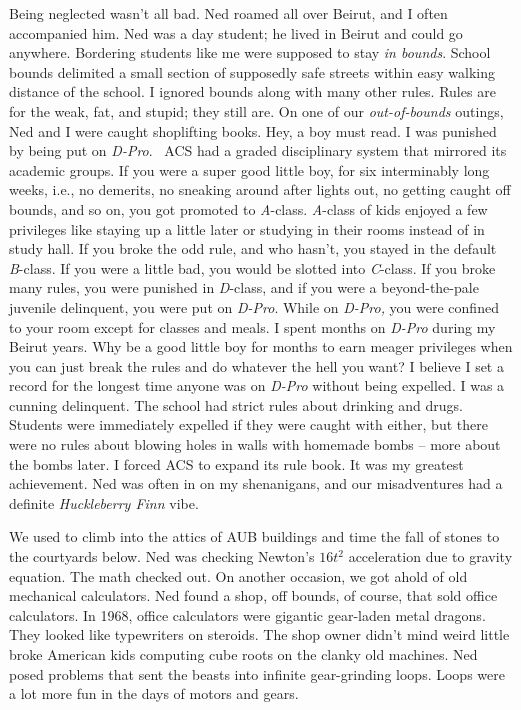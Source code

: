 Being neglected wasn't all bad. Ned roamed all over Beirut, and I often
accompanied him. Ned was a day student; he lived in Beirut and could go
anywhere. Bordering students like me were supposed to stay \emph{in
bounds}. School bounds delimited a small section of supposedly safe
streets within easy walking distance of the school. I ignored bounds
along with many other rules. Rules are for the weak, fat, and stupid;
they still are. On one of our \emph{out-of-bounds} outings, Ned and I
were caught shoplifting books. Hey, a boy must read. I was punished by
being put on \emph{D-Pro}.~ ACS had a graded disciplinary system that
mirrored its academic groups. If you were a super good little boy, for
six interminably long weeks, i.e., no demerits, no sneaking around after
lights out, no getting caught off bounds, and so on, you got promoted to
\emph{A}-class. \emph{A}-class of kids enjoyed a few privileges like
staying up a little later or studying in their rooms instead of in study
hall. If you broke the odd rule, and who hasn't, you stayed in the
default \emph{B}-class. If you were a little bad, you would be slotted
into \emph{C}-class. If you broke many rules, you were punished in
\emph{D}-class, and if you were a beyond-the-pale juvenile delinquent,
you were put on \emph{D-Pro}. While on \emph{D-Pro,} you were confined
to your room except for classes and meals. I spent months on
\emph{D-Pro} during my Beirut years. Why be a good little boy for months
to earn meager privileges when you can just break the rules and do
whatever the hell you want? I believe I set a record for the longest
time anyone was on \emph{D-Pro} without being expelled. I was a cunning
delinquent. The school had strict rules about drinking and drugs.
Students were immediately expelled if they were caught with either, but
there were no rules about blowing holes in walls with homemade bombs --
more about the bombs later. I forced ACS to expand its rule book. It was
my greatest achievement. Ned was often in on my shenanigans, and our
misadventures had a definite \emph{Huckleberry Finn} vibe.

We used to climb into the attics of AUB buildings and time the fall of
stones to the courtyards below. Ned was checking Newton's
$16t^2$ acceleration due to
gravity equation. The math checked out. On another occasion, we got
ahold of old mechanical calculators. Ned found a shop, off bounds, of
course, that sold office calculators. In 1968, office calculators were
gigantic gear-laden metal dragons. They looked like typewriters on
steroids. The shop owner didn't mind weird little broke American kids
computing cube roots on the clanky old machines. Ned posed problems that
sent the beasts into infinite gear-grinding loops. Loops were a lot more
fun in the days of motors and gears.

